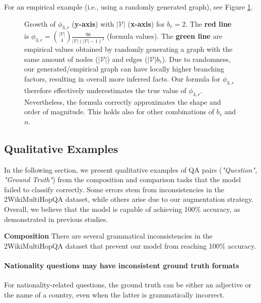         For an empirical example (i.e., using a randomly generated graph), see Figure \ref{fig:A_phi_n3_b2}.

        \begin{figure}[ht]
            \centering
            
            \caption{
                Growth of $\phi_{3,r}$ (\textbf{y-axis}) with $|\mathcal{V}|$ (\textbf{x-axis}) for $b_r=2$.
                The \textbf{red line} is $\phi_{3,r}=\binom{|\mathcal{V}|}{4}\frac{96}{|\mathcal{V}|(|\mathcal{V}|-1)^3}$ (formula values). 
                The \textbf{green line} are empirical values obtained by randomly generating a graph with the same amount of nodes ($|\mathcal{V}|$) and edges ($|\mathcal{V}| b_r$).
                Due to randomness, our generated/empirical graph can have locally higher branching factors, resulting in overall more inferred facts. Our formula for $\phi_{3,r}$ therefore effectively underestimates the true value of $\phi_{3,r}$. Nevertheless, the formula correctly approximates the shape and order of magnitude. This holds also for other combinations of $b_r$ and $n$.
                }
            \label{fig:A_phi_n3_b2}
        \end{figure}


    \subsection{Qualitative Examples}\label{sec:appendix_qualitative_examples}

    In the following section, we present qualitative examples of QA pairs (\textit{"Question", "Ground Truth"}) from the composition and comparison tasks that the model failed to classify correctly. Some errors stem from inconsistencies in the 2WikiMultiHopQA dataset, while others arise due to our augmentation strategy. Overall, we believe that the model is capable of achieving 100\% accuracy, as demonstrated in previous studies.
    
    \textbf{Composition}
    There are several grammatical inconsistencies in the 2WikiMultiHopQA dataset that prevent our model from reaching 100\% accuracy.
    
    \paragraph{Nationality questions may have inconsistent ground truth formats}
    For nationality-related questions, the ground truth can be either an adjective or the name of a country, even when the latter is grammatically incorrect.
    
